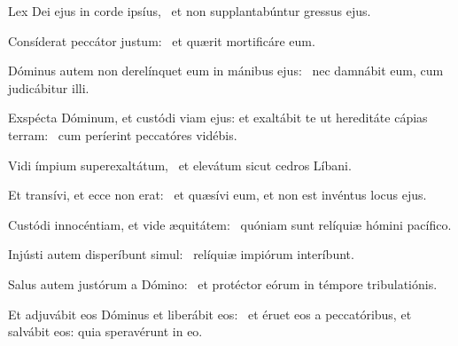 \item Lex Dei ejus in corde ipsíus,~\psstar{} et non supplantabúntur gressus ejus.

\item Consíderat peccátor justum:~\psstar{} et quærit mortificáre eum.

\item Dóminus autem non derelínquet eum in mánibus ejus:~\psstar{} nec damnábit eum, cum judicábitur illi.

\item Exspécta Dóminum, et custódi viam ejus: et exaltábit te ut hereditáte cápias terram:~\psstar{} cum períerint peccatóres vidébis.

\item Vidi ímpium superexaltátum,~\psstar{} et elevátum sicut cedros Líbani.

\item Et transívi, et ecce non erat:~\psstar{} et quæsívi eum, et non est invéntus locus ejus.

\item Custódi innocéntiam, et vide æquitátem:~\psstar{} quóniam sunt relíquiæ hómini pacífico.

\item Injústi autem disperíbunt simul:~\psstar{} relíquiæ impiórum interíbunt.

\item Salus autem justórum a Dómino:~\psstar{} et protéctor eórum in témpore tribulatiónis.

\item Et adjuvábit eos Dóminus et liberábit eos:~\psstar{} et éruet eos a peccatóribus, et salvábit eos: quia speravérunt in eo.